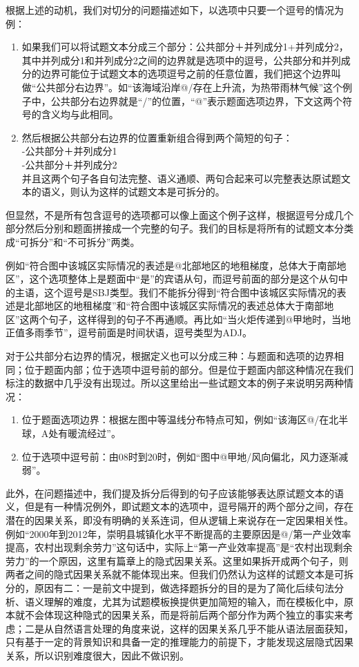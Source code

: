 \documentclass[master, winfont]{njuthesis}
\begin{document}
根据上述的动机，我们对切分的问题描述如下，以选项中只要一个逗号的情况为例：
\begin{enumerate}
	\item 如果我们可以将试题文本分成三个部分：公共部分＋并列成分1+并列成分2，其中并列成分1和并列成分2之间的边界就是选项中的逗号，公共部分和并列成分的边界可能位于试题文本的选项逗号之前的任意位置，我们把这个边界叫做“公共部分右边界”。如“该海域沿岸@/存在上升流，为热带雨林气候”这个例子中，公共部分右边界就是“/”的位置，“@”表示题面选项边界，下文这两个符号的含义均与此相同。
	\item 然后根据公共部分右边界的位置重新组合得到两个简短的句子：\\
		-公共部分＋并列成分1\\
		-公共部分＋并列成分2\\
		并且这两个句子各自句法完整、语义通顺、两句合起来可以完整表达原试题文本的语义，则认为这样的试题文本是可拆分的。
\end{enumerate}

但显然，不是所有包含逗号的选项都可以像上面这个例子这样，根据逗号分成几个部分然后分别和题面拼接成一个完整的句子。我们的目标是将所有的试题文本分类成“可拆分”和“不可拆分”两类。

例如“符合图中该城区实际情况的表述是@北部地区的地租梯度，总体大于南部地区”，这个选项整体上是题面中“是”的宾语从句，而逗号前面的部分是这个从句中的主语，这个逗号是SBJ类型。我们不能拆分得到“符合图中该城区实际情况的表述是北部地区的地租梯度”和“符合图中该城区实际情况的表述总体大于南部地区”这两个句子，这样得到的句子不再通顺。再比如“当火炬传递到@甲地时，当地正值多雨季节”，逗号前面是时间状语，逗号类型为ADJ。

对于公共部分右边界的情况，根据定义也可以分成三种：与题面和选项的边界相同；位于题面内部；位于选项中逗号前的部分。但是位于题面内部这种情况在我们标注的数据中几乎没有出现过。所以这里给出一些试题文本的例子来说明另两种情况：
\begin{enumerate}
  \item 位于题面选项边界：根据左图中等温线分布特点可知，例如“该海区@/在北半球，A处有暖流经过”。
  \item 位于选项中逗号前：由08时到20时，例如“图中@甲地/风向偏北，风力逐渐减弱”。
\end{enumerate}

此外，在问题描述中，我们提及拆分后得到的句子应该能够表达原试题文本的语义，但是有一种情况例外，即试题文本的选项中，逗号隔开的两个部分之间，存在潜在的因果关系，即没有明确的关系连词，但从逻辑上来说存在一定因果相关性。例如“2000年到2012年，崇明县城镇化水平不断提高的主要原因是@/第一产业效率提高，农村出现剩余劳力”这句话中，实际上“第一产业效率提高”是“农村出现剩余劳力”的一个原因，这里有篇章上的隐式因果关系\cite{liyancui2015}。这里如果拆开成两个句子，则两者之间的隐式因果关系就不能体现出来。但我们仍然认为这样的试题文本是可拆分的，原因有二：一是前文中提到，做选择题拆分的目的是为了简化后续句法分析、语义理解的难度，尤其为试题模板换提供更加简短的输入，而在模板化中，原本就不会体现这种隐式的因果关系，而是将前后两个部分作为两个独立的事实来考虑；二是从自然语言处理的角度来说，这样的因果关系几乎不能从语法层面获知，只有基于一定的背景知识和具备一定的推理能力的前提下，才能发现这层隐式因果关系，所以识别难度很大，因此不做识别。
\end{document}
